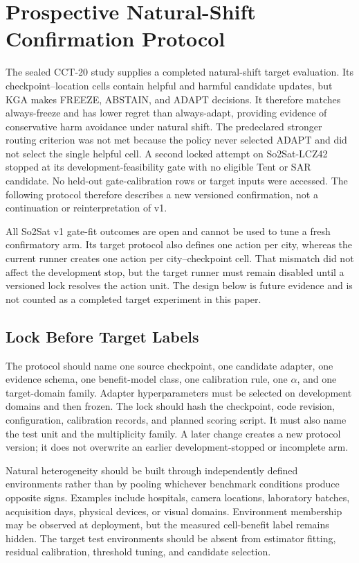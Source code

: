 \section{Prospective Natural-Shift Confirmation Protocol}
\label{app:compact-confirmation}

The sealed CCT-20 study supplies a completed natural-shift target evaluation. Its
\CCTCellCount{} checkpoint--location cells contain \CCTHelpfulCount{} helpful and
\CCTHarmfulCount{} harmful candidate updates, but KGA makes \CCTFreezeCount{} FREEZE,
\CCTAbstainCount{} ABSTAIN, and \CCTAdaptCount{} ADAPT decisions. It therefore matches
always-freeze and has lower regret than always-adapt, providing evidence of conservative harm
avoidance under natural shift. The predeclared stronger routing criterion was not met because the
policy never selected ADAPT and did not select the single helpful cell. A second
locked attempt on So2Sat-LCZ42 stopped at its development-feasibility gate with no eligible Tent or
SAR candidate. No held-out gate-calibration rows or target inputs were accessed. The following
protocol therefore describes a new versioned confirmation, not a continuation or reinterpretation
of v1.

All So2Sat v1 gate-fit outcomes are open and cannot be used to tune a fresh confirmatory arm. Its
target protocol also defines one action per city, whereas the current runner creates one action per
city--checkpoint cell. That mismatch did not affect the development stop, but the target runner
must remain disabled until a versioned lock resolves the action unit. The design below is future
evidence and is not counted as a completed target experiment in this paper.

\subsection{Lock Before Target Labels}

The protocol should name one source checkpoint, one candidate adapter, one evidence schema, one
benefit-model class, one calibration rule, one $\alpha$, and one target-domain family. Adapter
hyperparameters must be selected on development domains and then frozen. The lock should hash the
checkpoint, code revision, configuration, calibration records, and planned scoring script. It must
also name the test unit and the multiplicity family. A later change creates a new protocol version;
it does not overwrite an earlier development-stopped or incomplete arm.

Natural heterogeneity should be built through independently defined environments rather than by
pooling whichever benchmark conditions produce opposite signs. Examples include hospitals, camera
locations, laboratory batches, acquisition days, physical devices, or visual domains. Environment
membership may be observed at deployment, but the measured cell-benefit label remains hidden. The target
test environments should be absent from estimator fitting, residual calibration, threshold tuning,
and candidate selection.

